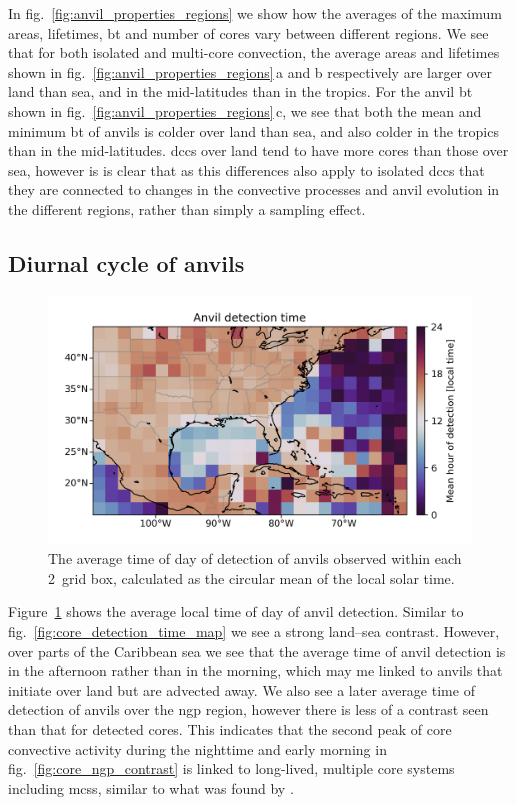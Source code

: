 In fig.~\ref{fig:anvil_properties_regions} we show how the averages of the maximum areas, lifetimes, \acrshort{bt} and number of cores vary between different regions.
We see that for both isolated and multi-core convection, the average areas and lifetimes shown in fig.~\ref{fig:anvil_properties_regions}\,a and b respectively are larger over land than sea, and in the mid-latitudes than in the tropics.
For the anvil \acrshort{bt} shown in fig.~\ref{fig:anvil_properties_regions}\,c, we see that both the mean and minimum \acrshort{bt} of anvils is colder over land than sea, and also colder in the tropics than in the mid-latitudes.
\acrshort{dcc}s over land tend to have more cores than those over sea, however is is clear that as this differences also apply to isolated \acrshort{dcc}s that they are connected to changes in the convective processes and anvil evolution in the different regions, rather than simply a sampling effect.

\subsection{Diurnal cycle of anvils}

\begin{figure}[tp]
    \centering
    \includegraphics[width=\textwidth]{figures/chapter2_23.png}
    \caption[
    The average time of detection of anvils
    ]{
    The average time of day of detection of anvils observed within each 2\textdegree\ grid box, calculated as the circular mean of the local solar time.
    }
    \label{fig:anvil_detection_time_map}
\end{figure}

Figure~\ref{fig:anvil_detection_time_map} shows the average local time of day of anvil detection.
Similar to fig.~\ref{fig:core_detection_time_map} we see a strong land--sea contrast.
However, over parts of the Caribbean sea we see that the average time of anvil detection is in the afternoon rather than in the morning, which may me linked to anvils that initiate over land but are advected away.
We also see a later average time of detection of anvils over the \acrshort{ngp} region, however there is less of a contrast seen than that for detected cores.
This indicates that the second peak of core convective activity during the nighttime and early morning in fig.~\ref{fig:core_ngp_contrast} is linked to long-lived, multiple core systems including \acrshort{mcs}s, similar to what was found by \citet{feng_spatiotemporal_2019}.

